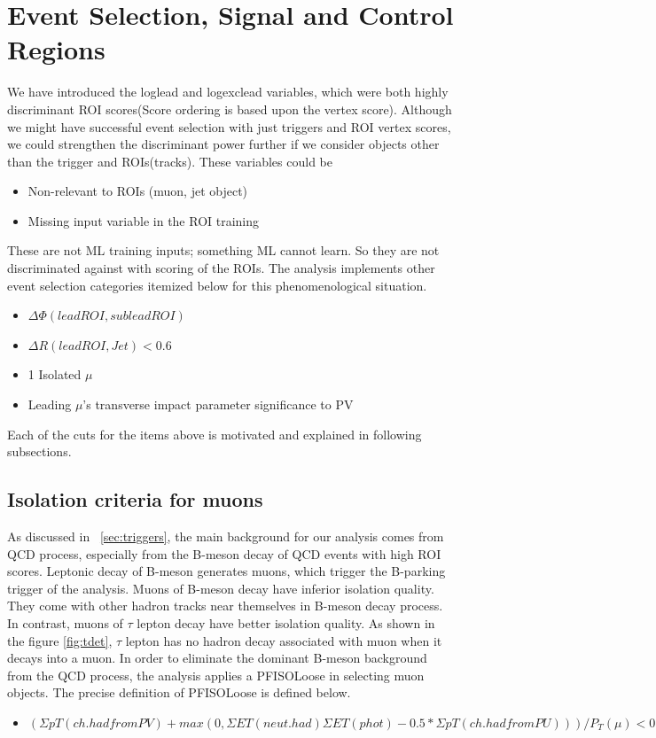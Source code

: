 \clearpage
\chapter{Event Selection, Signal and Control Regions}\label{sec:selections}
We have introduced the loglead and logexclead variables, which were both highly discriminant ROI scores(Score ordering is based upon the vertex score).
Although we might have successful event selection with just triggers and ROI vertex scores, we could strengthen the discriminant power further if we consider objects other than the trigger and ROIs(tracks).
These variables could be
\begin{itemize}
 \item Non-relevant to ROIs (muon, jet object)
 \item Missing input variable in the ROI training
\end{itemize}
These are not ML training inputs; something ML cannot learn.
So they are not discriminated against with scoring of the ROIs.
The analysis implements other event selection categories itemized below for this phenomenological situation.
\begin{itemize}
  \item $\Delta\Phi(lead ROI,sublead ROI)$ 
  \item $\Delta R(lead ROI, Jet)<$0.6 
  \item 1 Isolated $\mu$
  \item Leading $\mu$'s transverse impact parameter significance to PV
\end{itemize}

Each of the cuts for the items above is motivated and explained in following subsections.

\section{Isolation criteria for muons}\label{ref:muISO}
As discussed in ~\ref{sec:triggers}, the main background for our analysis comes from QCD process, especially from the B-meson decay of QCD events with high ROI scores.
Leptonic decay of B-meson generates muons, which trigger the B-parking trigger of the analysis.
Muons of B-meson decay have inferior isolation quality.
They come with other hadron tracks near themselves in B-meson decay process.
In contrast, muons of $\tau$ lepton decay have better isolation quality.
As shown in the figure \ref{fig:tdet}, $\tau$ lepton has no hadron decay associated with muon when it decays into a muon.
In order to eliminate the dominant B-meson background from the QCD process, the analysis applies a PFISOLoose in selecting muon objects.
The precise definition of PFISOLoose is defined below.
\begin{itemize}
  \item $(\Sigma pT(ch.had from PV)+max(0,\Sigma ET(neut.had) \Sigma ET (phot)-0.5* \Sigma pT(ch.had from PU)))/P_{T}(\mu)<0.25$
\end{itemize}

